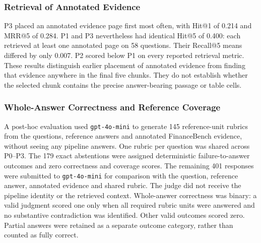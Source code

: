 \subsubsection{Retrieval of Annotated Evidence}
\begin{table}[H]
\centering
\caption{Retrieval of annotated FinanceBench evidence pages by the three RAG
configurations. Scores are question-level means over all 145 evaluation
questions, based on the final ranked chunks supplied to the answer model.
``Empty'' counts questions with no retrieved chunks; these questions receive
zero retrieval scores.}
\label{tab:main-retrieval-results}
\end{table}
P3 placed an annotated evidence page first most often, with Hit@1 of 0.214 and
MRR@5 of 0.284. P1 and P3 nevertheless had identical Hit@5 of 0.400: each
retrieved at least one annotated page on 58 questions. Their Recall@5 means
differed by only 0.007. P2 scored below P1 on every reported retrieval metric.
These results distinguish earlier placement of annotated evidence from finding
that evidence anywhere in the final five chunks. They do not establish whether
the selected chunk contains the precise answer-bearing passage or table cells.

\subsubsection{Whole-Answer Correctness and Reference Coverage}
A post-hoc evaluation used \texttt{gpt-4o-mini} to generate 145 reference-unit rubrics from the questions,
reference answers and annotated FinanceBench evidence, without seeing any
pipeline answers. One rubric per question was shared across P0--P3. The 179
exact abstentions were assigned deterministic failure-to-answer outcomes and
zero correctness and coverage scores. The remaining 401 responses were
submitted to \texttt{gpt-4o-mini} for comparison with the question, reference
answer, annotated evidence and shared rubric. The judge did not receive the
pipeline identity or the retrieved context.
Whole-answer correctness was binary: a valid judgment scored one only when all
required rubric units were answered and no substantive contradiction was
identified. Other valid outcomes scored zero. Partial answers were retained as
a separate outcome category, rather than counted as fully correct.

